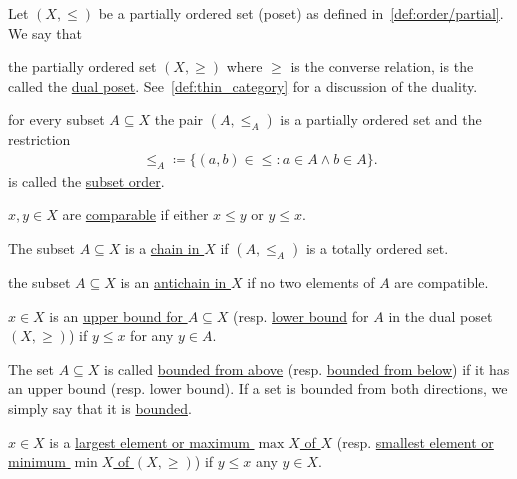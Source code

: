 \begin{definition}\label{def:poset}
  Let $(X, \leq)$ be a partially ordered set (poset) as defined in~\cref{def:order/partial}. We say that

  \begin{defenum}
    \item\label{def:poset/dual} the partially ordered set $(X, \geq)$ where $\geq$ is the converse relation, is the called the \ul{dual poset}. See~\cref{def:thin_category} for a discussion of the duality.

    \item\label{def:poset/subset_order} for every subset $A \subseteq X$ the pair $(A, \leq_A)$ is a partially ordered set and the restriction
    \begin{align*}
      \leq_A \coloneqq \{ (a, b) \in \leq \colon a \in A \land b \in A \}.
    \end{align*}
    is called the \ul{subset order}.

    \item\label{def:poset/comparable_elements} $x, y \in X$ are \ul{comparable} if either $x \leq y$ or $y \leq x$.

    \item\label{def:poset/chain} The subset $A \subseteq X$ is a \ul{chain in $X$} if $(A, \leq_A)$ is a totally ordered set.

    \item\label{def:poset/antichain} the subset $A \subseteq X$ is an \ul{antichain in $X$} if no two elements of $A$ are compatible.

    \item\label{def:poset/upper_lower_bound}\cite[170]{Enderton1977} $x \in X$ is an \ul{upper bound for $A \subseteq X$} (resp. \ul{lower bound} for $A$ in the dual poset $(X, \geq)$) if $y \leq x$ for any $y \in A$.

    \item\label{def:poset/bounded_set} The set $A \subseteq X$ is called \ul{bounded from above} (resp. \ul{bounded from below}) if it has an upper bound (resp. lower bound). If a set is bounded from both directions, we simply say that it is \ul{bounded}.

    \item\label{def:poset/largest_smallest_element}\cite[171]{Enderton1977} $x \in X$ is a \ul{largest element or maximum $\max X$ of $X$} (resp. \ul{smallest element or minimum $\min X$ of $(X, \geq)$}) if $y \leq x$ any $y \in X$.


\end{defenum}
\end{definition}
